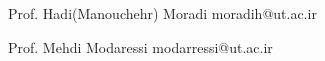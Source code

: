 

\begin{cvreferences}

  \cvreference
    {Prof. Hadi(Manouchehr) Moradi} %
    {moradih@ut.ac.ir} %
    
  \cvreference
    {Prof. Mehdi Modaressi} %
    {modarressi@ut.ac.ir} %
    



\end{cvreferences}
